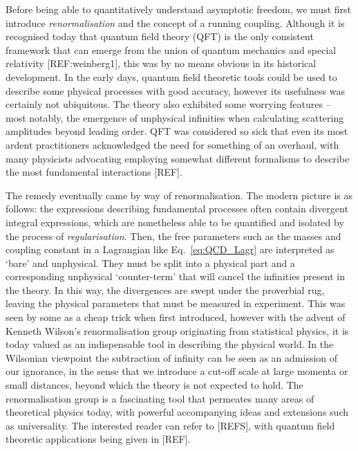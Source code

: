 \documentclass[12pt, a4paper, twoside]{book}
\begin{document}
Before being able to quantitatively understand asymptotic freedom, we must first introduce \emph{renormalisation} and the concept of a running coupling. Although it is recognised today that quantum field theory (QFT) is the only consistent framework that can emerge from the union of quantum mechanics and special relativity [REF:weinberg1], this was by no means obvious in its historical development. In the early days, quantum field theoretic tools could be used to describe some physical processes with good accuracy, however its usefulness was certainly not ubiquitous. The theory also exhibited some worrying features -- most notably, the emergence of unphysical infinities when calculating scattering amplitudes beyond leading order. QFT was considered so sick that even its most ardent practitioners acknowledged the need for something of an overhaul, with many physicists advocating employing somewhat different formalisms to describe the most fundamental interactions [REF].

The remedy eventually came by way of renormalisation. The modern picture is as follows: the expressions describing fundamental processes often contain divergent integral expressions, which are nonetheless able to be quantified and isolated by the process of \emph{regularisation}. Then, the free parameters such as the masses and coupling constant in a Lagrangian like Eq.~\eqref{eq:QCD_Lagr} are interpreted as `bare' and unphysical. They must be split into a physical part and a corresponding unphysical `counter-term' that will cancel the infinities present in the theory. In this way, the divergences are swept under the proverbial rug, leaving the physical parameters that must be measured in experiment. This was seen by some as a cheap trick when first introduced, however with the advent of Kenneth Wilson's renormalisation group originating from statistical physics, it is today valued as an indispensable tool in describing the physical world. In the Wilsonian viewpoint the subtraction of infinity can be seen as an admission of our ignorance, in the sense that we introduce a cut-off scale at large momenta or small distances, beyond which the theory is not expected to hold. The renormalisation group is a fascinating tool that permeates many areas of theoretical physics today, with powerful accompanying ideas and extensions such as universality. The interested reader can refer to [REFS], with quantum field theoretic applications being given in [REF].
\end{document}
